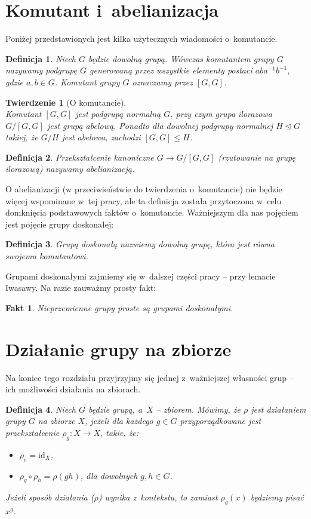 \documentclass[licencjacka]{pracamgr}
\newtheorem{deff}{Definicja}[section]
\newtheorem{thh}{Twierdzenie}[section]
\newtheorem{fact}{Fakt}[section]
\begin{document}
\section{Komutant i~abelianizacja}
Poniżej przedstawionych jest kilka użytecznych wiadomości o~komutancie.
\begin{deff}
	Niech $G$ będzie dowolną grupą. Wówczas \emph{komutantem grupy $G$} nazywamy podgrupę $G$ generowaną przez wszystkie elementy postaci
	$aba^{-1}b^{-1}$, gdzie $a, b \in G$. Komutant grupy $G$ oznaczamy przez $[G, G]$.
\end{deff}
\begin{thh}[O komutancie] $ $\\
	Komutant $[G,G]$ jest podgrupą normalną $G$, przy czym grupa ilorazowa $G/[G,G]$ jest grupą abelową.
	Ponadto dla dowolnej podgrupy normalnej $H \trianglelefteq G$ takiej, że $G/H$ jest abelowa, zachodzi $[G,G] \le H$.
\end{thh}
\begin{deff}  
	Przekształcenie kanoniczne $G \to G/[G,G]$ (rzutowanie na grupę ilorazową) nazywamy abelianizacją.
\end{deff}

O abelianizacji (w przeciwieństwie do twierdzenia o~komutancie) nie będzie więcej wspominane w~tej pracy, 
ale ta definicja została przytoczona w~celu domknięcia podstawowych faktów o~komutancie.
Ważniejszym dla nas pojęciem jest pojęcie grupy doskonałej:

\begin{deff}
	\emph{Grupą doskonałą} nazwiemy dowolną grupę, która jest równa swojemu komutantowi.
\end{deff}

Grupami doskonałymi zajmiemy się w~dalszej części pracy -- przy lemacie Iwasawy.
Na razie zauważmy prosty fakt:

\begin{fact}
	Nieprzemienne grupy proste są grupami doskonałymi.
\end{fact}


\section{Działanie grupy na zbiorze}
Na koniec tego rozdziału przyjrzyjmy się jednej z~ważniejszej własności grup -- ich możliwości działania na zbiorach.

\begin{deff}
 	Niech $G$ będzie grupą, a~$X$ -- zbiorem. Mówimy, że \emph{$\rho$ jest działaniem grupy $G$ na zbiorze $X$}, 
	jeżeli dla każdego $g \in G$ przyporządkowane jest przekształcenie $\rho_g\colon X \to X$, takie, że:
	\begin{itemize}
		\item $\rho_e = \mathrm{id}_X$,
		\item $\rho_g \circ \rho_h = \rho(gh)$, dla dowolnych $g, h \in G$.
	\end{itemize}
	Jeżeli sposób działania ($\rho$) wynika z~kontekstu, to zamiast $\rho_g(x)$ będziemy pisać $x^g$.
\end{deff}
\end{document}
